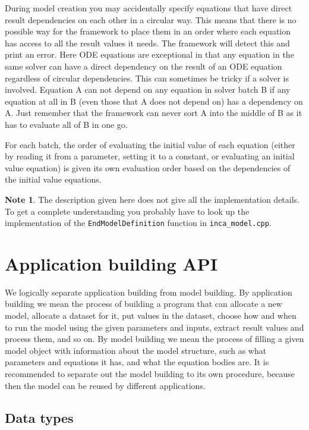 \documentclass[11pt]{article}
\theoremstyle{definition}
\newtheorem{mynote}{Note}
\newenvironment{note}%
  {\begin{lrbox}{\notebox}%
   \begin{minipage}{\dimexpr\linewidth-2\fboxsep}
   \begin{mynote}}%
  {\end{mynote}%
   \end{minipage}%
   \end{lrbox}%
   \begin{trivlist}
     \item[]\colorbox{silver}{\usebox\notebox}
   \end{trivlist}}
\begin{document}
During model creation you may accidentally specify equations that have direct result dependencies on each other in a circular way. This means that there is no possible way for the framework to place them in an order where each equation has access to all the result values it needs. The framework will detect this and print an error. Here ODE equations are exceptional in that any equation in the same solver can have a direct dependency on the result of an ODE equation regardless of circular dependencies. This can sometimes be tricky if a solver is involved. Equation A can not depend on any equation in solver batch B if any equation at all in B (even those that A does not depend on) has a dependency on A. Just remember that the framework can never sort A into the middle of B as it has to evaluate all of B in one go.

For each batch, the order of evaluating the initial value of each equation (either by reading it from a parameter, setting it to a constant, or evaluating an initial value equation) is given its own evaluation order based on the dependencies of the initial value equations.

\begin{note}
The description given here does not give all the implementation details. To get a complete understanding you probably have to look up the implementation of the {\tt EndModelDefinition} function in {\tt inca\_model.cpp}.
\end{note}


\section{Application building API}

We logically separate application building from model building. By application building we mean the process of building a program that can allocate a new model, allocate a dataset for it, put values in the dataset, choose how and when to run the model using the given parameters and inputs, extract result values and process them, and so on. By model building we mean the process of filling a given model object with information about the model structure, such as what parameters and equations it has, and what the equation bodies are. It is recommended to separate out the model building to its own procedure, because then the model can be reused by different applications.

\subsection{Data types}
\end{document}

